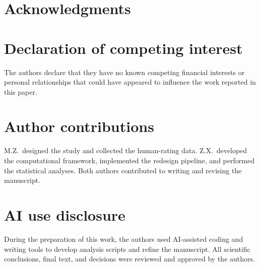 \documentclass[preprint,12pt,authoryear]{elsarticle}
\begin{document}
\section*{Acknowledgments}

\section*{Declaration of competing interest}
The authors declare that they have no known competing financial interests or personal relationships that could have appeared to influence the work reported in this paper.

\section*{Author contributions}
M.Z.~designed the study and collected the human-rating data. Z.X.~developed the computational framework, implemented the redesign pipeline, and performed the statistical analyses. Both authors contributed to writing and revising the manuscript.

\section*{AI use disclosure}
During the preparation of this work, the authors used AI-assisted coding and writing tools to develop analysis scripts and refine the manuscript. All scientific conclusions, final text, and decisions were reviewed and approved by the authors.



\end{document}

